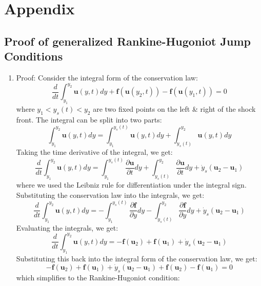 \documentclass[11pt]{article}
\begin{document}
\section{Appendix}
\subsection{Proof of generalized Rankine-Hugoniot Jump Conditions}
\begin{enumerate}
\item Proof: Consider the integral form of the conservation law:
  \begin{equation}
    \frac{d}{dt} \int_{y_1}^{y_2} \bm{u}(y,t) dy + \bm{f}(\bm{u}(y_2, t)) - \bm{f}(\bm{u}(y_1, t)) = 0
  \end{equation}
  where $y_1 < y_s(t) < y_2$ are two fixed points on the left \& right of the shock front. The integral can be split into two parts:
  \begin{equation}
    \int_{y_1}^{y_2} \bm{u}(y,t) dy = \int_{y_1}^{y_s(t)} \bm{u}(y,t) dy + \int_{y_s(t)}^{y_2} \bm{u}(y,t) dy
  \end{equation}
  Taking the time derivative of the integral, we get:
  \begin{equation}
    \frac{d}{dt} \int_{y_1}^{y_2} \bm{u}(y,t) dy = \int_{y_1}^{y_s(t)} \frac{\partial \bm{u}}{\partial t} dy + \int_{y_s(t)}^{y_2} \frac{\partial \bm{u}}{\partial t} dy + \dot{y}_s (\bm{u}_2 - \bm{u}_1)
  \end{equation}
  where we used the Leibniz rule for differentiation under the integral sign. Substituting the conservation law into the integrals, we get:
  \begin{equation}
    \frac{d}{dt} \int_{y_1}^{y_2} \bm{u}(y,t) dy = -\int_{y_1}^{y_s(t)} \frac{\partial \bm{f}}{\partial y} dy - \int_{y_s(t)}^{y_2} \frac{\partial \bm{f}}{\partial y} dy + \dot{y}_s (\bm{u}_2 - \bm{u}_1)
  \end{equation}
  Evaluating the integrals, we get:
  \begin{equation}
    \frac{d}{dt} \int_{y_1}^{y_2} \bm{u}(y,t) dy = -\bm{f}(\bm{u}_2) + \bm{f}(\bm{u}_1) + \dot{y}_s (\bm{u}_2 - \bm{u}_1)
  \end{equation}
  Substituting this back into the integral form of the conservation law, we get:
  \begin{equation}
    -\bm{f}(\bm{u}_2) + \bm{f}(\bm{u}_1) + \dot{y}_s (\bm{u}_2 - \bm{u}_1) + \bm{f}(\bm{u}_2) - \bm{f}(\bm{u}_1) = 0
  \end{equation}
  which simplifies to the Rankine-Hugoniot condition:

\end{enumerate}
\end{document}
